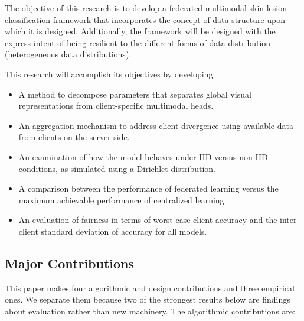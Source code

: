 \documentclass[utf8]{FrontiersinHarvard} %
\begin{document}
The objective of this research is to develop a federated multimodal skin lesion classification framework that incorporates the concept of data structure upon which it is designed. Additionally, the framework will be designed with the express intent of being resilient to the different forms of data distribution (heterogeneous data distributions).

This research will accomplish its objectives by developing:


\begin{itemize}
    \item A method to decompose parameters that separates global visual representations from client-specific multimodal heads.
    \item An aggregation mechanism to address client divergence using available data from clients on the server-side.
    \item An examination of how the model behaves under IID versus non-IID conditions, as simulated using a Dirichlet distribution.
    \item A comparison between the performance of federated learning versus the maximum achievable performance of centralized learning.
    \item An evaluation of fairness in terms of worst-case client accuracy and the inter-client standard deviation of accuracy for all models.
\end{itemize}

\subsection{Major Contributions}

This paper makes four algorithmic and design contributions and three empirical ones. We separate them because two of the strongest results below are findings about evaluation rather than new machinery. The algorithmic contributions are:
\end{document}
